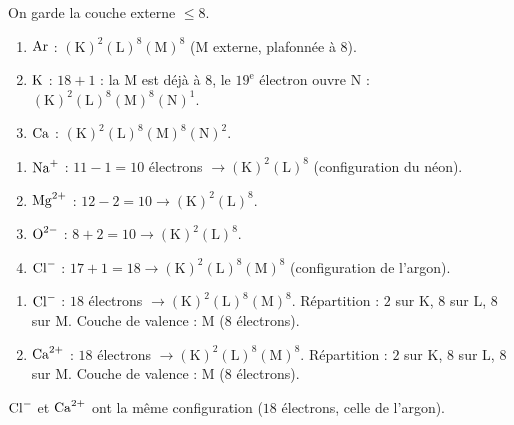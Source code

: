 \documentclass[11pt,a4paper]{article}
\begin{document}
\begin{corrige}
On garde la couche externe $\le 8$.
\begin{enumerate}[label=\alph*)]
  \item $\ce{Ar}$ : $(\mathrm{K})^2(\mathrm{L})^8(\mathrm{M})^8$ (M externe, plafonnée à $8$).
  \item $\ce{K}$ : $18+1$ : la M est déjà à $8$, le $19^\text{e}$ électron ouvre N :
        $(\mathrm{K})^2(\mathrm{L})^8(\mathrm{M})^8(\mathrm{N})^1$.
  \item $\ce{Ca}$ : $(\mathrm{K})^2(\mathrm{L})^8(\mathrm{M})^8(\mathrm{N})^2$.
\end{enumerate}
\end{corrige}

\begin{corrige}
\begin{enumerate}[label=\alph*)]
  \item $\ce{Na^{+}}$ : $11-1 = 10$ électrons $\to (\mathrm{K})^2(\mathrm{L})^8$ (configuration du néon).
  \item $\ce{Mg^{2+}}$ : $12-2 = 10 \to (\mathrm{K})^2(\mathrm{L})^8$.
  \item $\ce{O^{2-}}$ : $8+2 = 10 \to (\mathrm{K})^2(\mathrm{L})^8$.
  \item $\ce{Cl^{-}}$ : $17+1 = 18 \to (\mathrm{K})^2(\mathrm{L})^8(\mathrm{M})^8$ (configuration de l'argon).
\end{enumerate}
\end{corrige}

\begin{corrige}
\begin{enumerate}[label=\alph*)]
  \item $\ce{Cl^{-}}$ : $18$ électrons $\to (\mathrm{K})^2(\mathrm{L})^8(\mathrm{M})^8$. Répartition :
        $2$ sur K, $8$ sur L, $8$ sur M. Couche de valence : M ($8$ électrons).
  \item $\ce{Ca^{2+}}$ : $18$ électrons $\to (\mathrm{K})^2(\mathrm{L})^8(\mathrm{M})^8$. Répartition :
        $2$ sur K, $8$ sur L, $8$ sur M. Couche de valence : M ($8$ électrons).
\end{enumerate}
$\ce{Cl^{-}}$ et $\ce{Ca^{2+}}$ ont la même configuration ($18$ électrons, celle de l'argon).
\end{corrige}
\end{document}
